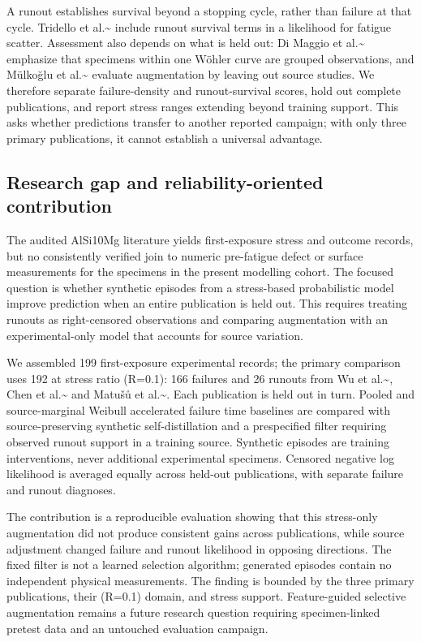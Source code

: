 \documentclass[12pt,a4paper]{article}
\begin{document}
A runout establishes survival beyond a stopping cycle, rather than failure at that cycle. Tridello et al.\textasciitilde{}\cite{tridello2023a} include runout survival terms in a likelihood for fatigue scatter. Assessment also depends on what is held out: Di Maggio et al.\textasciitilde{}\cite{dimaggio2025} emphasize that specimens within one Wöhler curve are grouped observations, and Mülkoğlu et al.\textasciitilde{}\cite{mulkoglu2026} evaluate augmentation by leaving out source studies. We therefore separate failure-density and runout-survival scores, hold out complete publications, and report stress ranges extending beyond training support. This asks whether predictions transfer to another reported campaign; with only three primary publications, it cannot establish a universal advantage.

\subsection{Research gap and reliability-oriented contribution}

The audited AlSi10Mg literature yields first-exposure stress and outcome records, but no consistently verified join to numeric pre-fatigue defect or surface measurements for the specimens in the present modelling cohort. The focused question is whether synthetic episodes from a stress-based probabilistic model improve prediction when an entire publication is held out. This requires treating runouts as right-censored observations and comparing augmentation with an experimental-only model that accounts for source variation.

We assembled 199 first-exposure experimental records; the primary comparison uses 192 at stress ratio (R=0.1): 166 failures and 26 runouts from Wu et al.\textasciitilde{}\cite{wu2021}, Chen et al.\textasciitilde{}\cite{chen2024} and Matušů et al.\textasciitilde{}\cite{matusu2026}. Each publication is held out in turn. Pooled and source-marginal Weibull accelerated failure time baselines are compared with source-preserving synthetic self-distillation and a prespecified filter requiring observed runout support in a training source. Synthetic episodes are training interventions, never additional experimental specimens. Censored negative log likelihood is averaged equally across held-out publications, with separate failure and runout diagnoses.

The contribution is a reproducible evaluation showing that this stress-only augmentation did not produce consistent gains across publications, while source adjustment changed failure and runout likelihood in opposing directions. The fixed filter is not a learned selection algorithm; generated episodes contain no independent physical measurements. The finding is bounded by the three primary publications, their (R=0.1) domain, and stress support. Feature-guided selective augmentation remains a future research question requiring specimen-linked pretest data and an untouched evaluation campaign.
\end{document}
